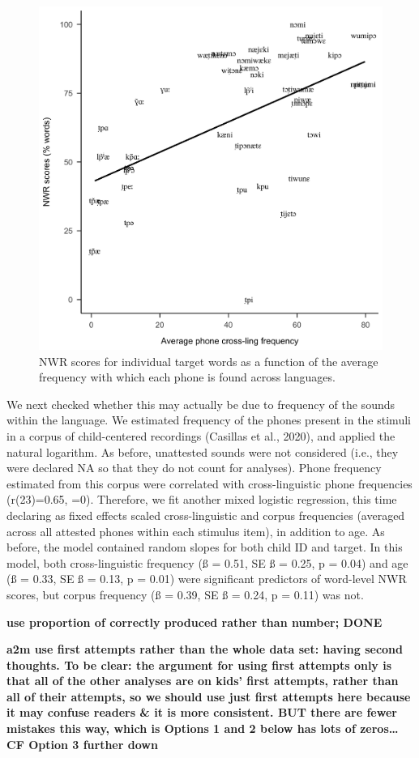 \documentclass[english,,man,floatsintext]{apa6}
\begin{document}
\begin{figure}[!t]

{\centering \includegraphics[width=0.65\linewidth]{nwr.by.freq.ITEM} 

}

\caption{NWR scores for individual target words as a function of the average frequency with which each phone is found across languages.}\label{fig:Fig2-xling-freq}
\end{figure}

We next checked whether this may actually be due to frequency of the
sounds within the language. We estimated frequency of the phones present
in the stimuli in a corpus of child-centered recordings (Casillas et
al., 2020), and applied the natural logarithm. As before, unattested
sounds were not considered (i.e., they were declared NA so that they do
not count for analyses). Phone frequency estimated from this corpus were
correlated with cross-linguistic phone frequencies (r(23)=0.65, =0).
Therefore, we fit another mixed logistic regression, this time declaring
as fixed effects scaled cross-linguistic and corpus frequencies
(averaged across all attested phones within each stimulus item), in
addition to age. As before, the model contained random slopes for both
child ID and target. In this model, both cross-linguistic frequency (ß =
0.51, SE ß = 0.25, p = 0.04) and age (ß = 0.33, SE ß = 0.13, p = 0.01)
were significant predictors of word-level NWR scores, but corpus
frequency (ß = 0.39, SE ß = 0.24, p = 0.11) was not.

\textbf{use proportion of correctly produced rather than number; DONE}

\textbf{a2m use first attempts rather than the whole data set: having
second thoughts. To be clear: the argument for using first attempts only
is that all of the other analyses are on kids' first attempts, rather
than all of their attempts, so we should use just first attempts here
because it may confuse readers \& it is more consistent. BUT there are
fewer mistakes this way, which is Options 1 and 2 below has lots of
zeros\ldots{} CF Option 3 further down}
\end{document}
